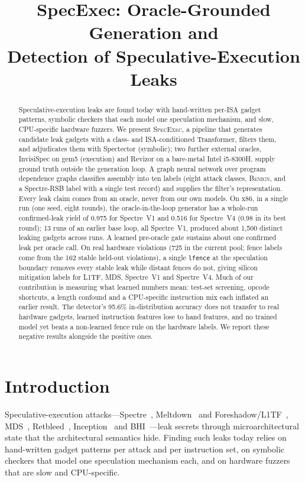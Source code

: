 \documentclass[conference]{IEEEtran}
\title{SpecExec: Oracle-Grounded Generation and\\
Detection of Speculative-Execution Leaks}
\author{\IEEEauthorblockN{Anonymous}}
\newcommand{\cls}[1]{\textsc{#1}}
\begin{document}
\maketitle

\begin{abstract}
Speculative-execution leaks are found today with hand-written per-ISA gadget
patterns, symbolic checkers that each model one speculation mechanism, and slow,
CPU-specific hardware fuzzers. We present \textsc{SpecExec}, a pipeline that
generates candidate leak gadgets with a class- and ISA-conditioned Transformer,
filters them, and adjudicates them with Spectector (symbolic); two further
external oracles, InvisiSpec on gem5 (execution) and Revizor on a bare-metal
Intel i5-8300H, supply ground truth outside the generation loop. A graph neural
network over program dependence graphs classifies assembly into ten labels
(eight attack classes, \cls{Benign}, and a Spectre-RSB label with a single test
record) and supplies the filter's representation. Every leak
claim comes from an oracle, never from our own models. On x86, in a single run
(one seed, eight rounds), the oracle-in-the-loop generator has a whole-run
confirmed-leak yield of 0.975 for Spectre~V1 and 0.516 for Spectre~V4 (0.98 in
its best round); 13 runs of an earlier base loop, all Spectre~V1, produced
about 1,500 distinct leaking gadgets across runs. A learned pre-oracle gate
sustains about one confirmed leak per
oracle call. On real hardware violations (725 in the current pool; fence
labels come from the 162 stable held-out violations), a single \texttt{lfence} at the
speculation boundary removes every stable leak while distant fences do not,
giving silicon mitigation labels for L1TF, MDS, Spectre~V1 and Spectre~V4. Much of
our contribution is measuring what learned numbers mean: test-set screening,
opcode shortcuts, a length confound and a CPU-specific instruction mix each
inflated an earlier result. The detector's 95.6\% in-distribution accuracy does
not transfer to real hardware gadgets, learned instruction features lose to
hand features, and no trained model yet beats a non-learned fence rule on the
hardware labels. We report these negative results alongside the positive ones.
\end{abstract}

\section{Introduction}
\label{sec:intro}

Speculative-execution attacks---Spectre~\cite{kocher2019spectre},
Meltdown~\cite{lipp2018meltdown} and Foreshadow/L1TF~\cite{vanbulck2018foreshadow},
MDS~\cite{vanschaik2019ridl,schwarz2019zombieload},
Retbleed~\cite{wikner2022retbleed}, Inception~\cite{trujillo2023inception} and
BHI~\cite{barberis2022bhi}---leak secrets through microarchitectural state that
the architectural semantics hide. Finding such leaks today relies on
hand-written gadget patterns per attack and per instruction set, on symbolic
checkers that model one speculation mechanism each, and on hardware fuzzers
that are slow and CPU-specific.
\end{document}
